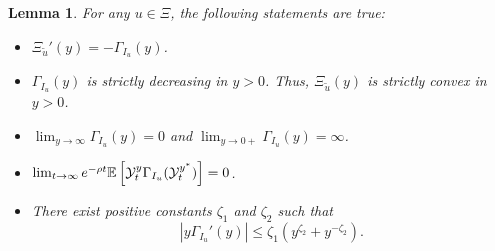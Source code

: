 \documentclass[a4paper,report, 11pt]{article}
\newtheorem{lem}{Lemma}[section]
\begin{document}
\begin{lem}\label{lem:Xi-Gamma}
	For any $u\in \Xi$, the following statements are true:
	\begin{itemize}
		\item[(a)] $\Xi_{\tilde{u}}'(y) = -\Gamma_{I_u}(y)$. 
		\item[(b)] $\Gamma_{I_u}(y)$ is strictly decreasing in $y>0$. Thus, $\Xi_{\tilde{u}}(y)$ is strictly convex in $y>0$. 
		\item[(c)] $\lim_{y\to \infty} \Gamma_{I_u}(y)=0$ and $\lim_{y\to 0+}\Gamma_{I_u}(y)=\infty$. 
		
		\item[(d)] $\lim_{t\to\infty} e^{-\rho t} \mathbb{E}\left[{\cal Y}_t^y \Gamma_{I_u}({\cal Y}_t^{y^*})\right]=0$. 
		
		\item[(e)] There exist positive constants $\zeta_1$ and $\zeta_2$ such that 
		\begin{equation*}
		|y\Gamma_{I_u}'(y)| \le \zeta_1 (y^{\zeta_2}+y^{-\zeta_2}). 
		\end{equation*}
	\end{itemize}
\end{lem}
\end{document}
